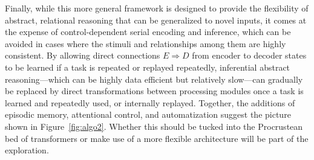 Finally, while this more general framework is designed to provide the flexibility of abstract, relational reasoning that can be generalized to novel inputs, it comes at the expense of control-dependent serial encoding and inference, which can be avoided in cases where the stimuli and relationships among them are highly consistent. By allowing
direct connections $E \Rightarrow D$ from encoder to decoder states to be learned if a task is repeated or replayed repeatedly, inferential abstract reasoning---which can be highly data efficient but relatively slow---can gradually be replaced by direct transformations between processing modules once a task is learned and repeatedly used, or internally replayed.  Together, the additions of episodic memory, attentional control, and automatization 
suggest the picture shown in Figure~\ref{fig:algo2}. Whether this should be tucked into the Procrustean bed of transformers or make use of a more flexible architecture will be part of the exploration.


